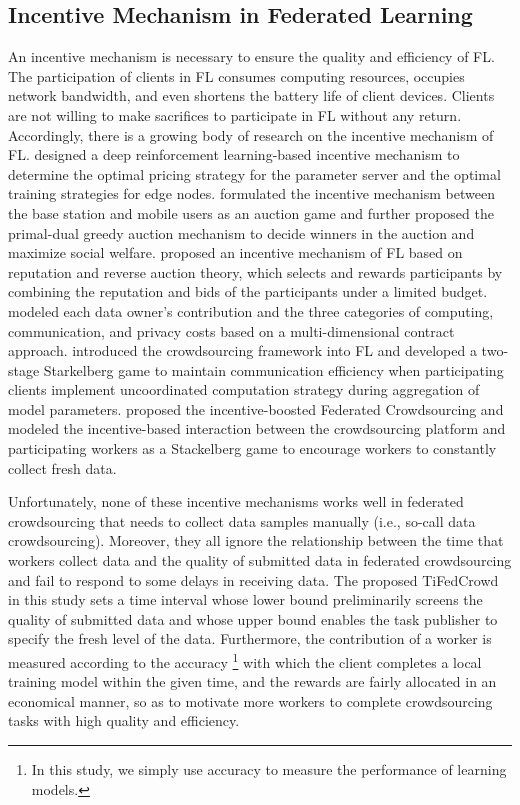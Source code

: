 \documentclass[final,1p,times]{elsarticle}
\begin{document}
\subsection{Incentive Mechanism in Federated Learning}
An incentive mechanism is necessary to ensure the quality and efficiency of FL. The participation of clients in FL consumes computing resources, occupies network bandwidth, and even shortens the battery life of client devices. Clients are not willing to make sacrifices to participate in FL without any return. Accordingly, there is a growing body of research on the incentive mechanism of FL. \cite{zhan2020learn} designed a deep reinforcement learning-based incentive mechanism to determine the optimal pricing strategy for the parameter server and the optimal training strategies for edge nodes. \cite{le2021incentive} formulated the incentive mechanism between the base station and mobile users as an auction game and further proposed the primal-dual greedy auction mechanism to decide winners in the auction and maximize social welfare. \cite{zhang2021incentive} proposed an incentive mechanism of FL based on reputation and reverse auction theory, which selects and rewards participants by combining the reputation and bids of the participants under a limited budget.  \cite{9317806} modeled each data owner's contribution and the three categories of computing, communication, and privacy costs based on a multi-dimensional contract approach. \cite{pandey2019incentivize} introduced the crowdsourcing framework into FL and developed a two-stage Starkelberg game to maintain communication efficiency when participating clients implement uncoordinated computation strategy during aggregation of model parameters. \cite{kang2022incentive} proposed the incentive-boosted Federated Crowdsourcing and modeled the incentive-based interaction between the crowdsourcing platform and participating workers as a Stackelberg game to encourage workers to constantly collect fresh data.

Unfortunately, none of these incentive mechanisms works well in federated crowdsourcing that needs to collect data samples manually (i.e., so-call data crowdsourcing). Moreover, they all ignore the relationship between the time that workers collect data and the quality of submitted data in federated crowdsourcing and fail to respond to some delays in receiving data. The proposed TiFedCrowd in this study sets a time interval whose lower bound preliminarily screens the quality of submitted data and whose upper bound enables the task publisher to specify the fresh level of the data. Furthermore, the contribution of a worker is measured according to the accuracy \footnote{In this study, we simply use accuracy to measure the performance of learning models.} with which the client completes a local training model within the given time, and the rewards are fairly allocated in an economical manner, so as to motivate more workers to complete crowdsourcing tasks with high quality and efficiency.
\end{document}
